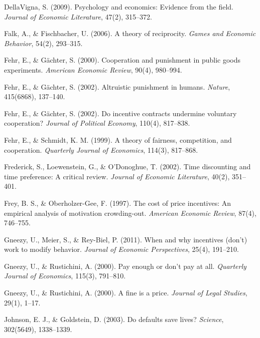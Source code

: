 \documentclass[11pt,a4paper]{article}
\begin{document}
\vspace{0.3cm}
DellaVigna, S. (2009). Psychology and economics: Evidence from the field. \textit{Journal of Economic Literature}, 47(2), 315--372.

\vspace{0.3cm}
Falk, A., \& Fischbacher, U. (2006). A theory of reciprocity. \textit{Games and Economic Behavior}, 54(2), 293--315.

\vspace{0.3cm}
Fehr, E., \& Gächter, S. (2000). Cooperation and punishment in public goods experiments. \textit{American Economic Review}, 90(4), 980--994.

\vspace{0.3cm}
Fehr, E., \& Gächter, S. (2002). Altruistic punishment in humans. \textit{Nature}, 415(6868), 137--140.

\vspace{0.3cm}
Fehr, E., \& Gächter, S. (2002). Do incentive contracts undermine voluntary cooperation? \textit{Journal of Political Economy}, 110(4), 817--838.

\vspace{0.3cm}
Fehr, E., \& Schmidt, K. M. (1999). A theory of fairness, competition, and cooperation. \textit{Quarterly Journal of Economics}, 114(3), 817--868.

\vspace{0.3cm}
Frederick, S., Loewenstein, G., \& O'Donoghue, T. (2002). Time discounting and time preference: A critical review. \textit{Journal of Economic Literature}, 40(2), 351--401.

\vspace{0.3cm}
Frey, B. S., \& Oberholzer-Gee, F. (1997). The cost of price incentives: An empirical analysis of motivation crowding-out. \textit{American Economic Review}, 87(4), 746--755.

\vspace{0.3cm}
Gneezy, U., Meier, S., \& Rey-Biel, P. (2011). When and why incentives (don't) work to modify behavior. \textit{Journal of Economic Perspectives}, 25(4), 191--210.

\vspace{0.3cm}
Gneezy, U., \& Rustichini, A. (2000). Pay enough or don't pay at all. \textit{Quarterly Journal of Economics}, 115(3), 791--810.

\vspace{0.3cm}
Gneezy, U., \& Rustichini, A. (2000). A fine is a price. \textit{Journal of Legal Studies}, 29(1), 1--17.

\vspace{0.3cm}
Johnson, E. J., \& Goldstein, D. (2003). Do defaults save lives? \textit{Science}, 302(5649), 1338--1339.
\end{document}
